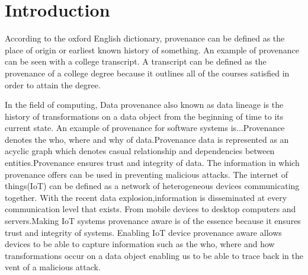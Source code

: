 \chapter{Introduction}\label{chapter:introduction}
According to the oxford English dictionary, provenance can be defined as the place of origin or earliest known history of something. An example of provenance can be seen with a college transcript. A transcript can be defined as the provenance of a college degree because it outlines all of the courses satisfied in order to attain the degree.

\par In the field of computing, Data provenance also known as data lineage is the history of transformations on a data object from the beginning of time to its current state. An example of provenance for software systems is...Provenance denotes the who, where and why of data.Provenance data is represented as an acyclic graph which denotes casual relationship and dependencies between entities.Provenance ensures trust and integrity of data. The information in which provenance offers can be used in preventing malicious attacks. The internet of things(IoT) can be defined as a network of heterogeneous devices communicating together. With the recent data explosion,information is disseminated at every communication level that exists. From mobile devices to desktop computers and servers.Making IoT systems provenance aware is of the essence because it ensures trust and  integrity of systems. Enabling IoT device provenance aware allows devices to be able to capture information such as the who, where and how transformations occur on a data object enabling us to be able to trace back in the vent of a malicious attack.

